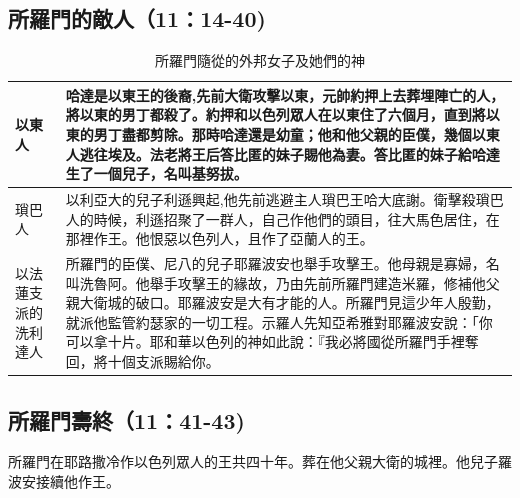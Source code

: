 \documentclass{ctexart}
\begin{document}
\subsection{所羅門的敵人（11：14-40)}
\begin{table}[!hbp]
\centering 
\begin{tabular}{|p{2cm}|p{14cm}|}
\hline
\hline
以東人&哈達是以東王的後裔,先前大衛攻擊以東，元帥約押上去葬埋陣亡的人，將以東的男丁都殺了。約押和以色列眾人在以東住了六個月，直到將以東的男丁盡都剪除。那時哈達還是幼童；他和他父親的臣僕，幾個以東人逃往埃及。法老將王后答比匿的妹子賜他為妻。答比匿的妹子給哈達生了一個兒子，名叫基努拔。\\\hline
瑣巴人&以利亞大的兒子利遜興起,他先前逃避主人瑣巴王哈大底謝。衛擊殺瑣巴人的時候，利遜招聚了一群人，自己作他們的頭目，往大馬色居住，在那裡作王。他恨惡以色列人，且作了亞蘭人的王。 \\\hline
以法蓮支派的洗利達人&所羅門的臣僕、尼八的兒子耶羅波安也舉手攻擊王。他母親是寡婦，名叫洗魯阿。他舉手攻擊王的緣故，乃由先前所羅門建造米羅，修補他父親大衛城的破口。耶羅波安是大有才能的人。所羅門見這少年人殷勤，就派他監管約瑟家的一切工程。示羅人先知亞希雅對耶羅波安說：「你可以拿十片。耶和華以色列的神如此說：『我必將國從所羅門手裡奪回，將十個支派賜給你。 \\\hline
\end{tabular}
\caption{所羅門隨從的外邦女子及她們的神}
\end{table}


\subsection{所羅門壽終（11：41-43)}
所羅門在耶路撒冷作以色列眾人的王共四十年。葬在他父親大衛的城裡。他兒子羅波安接續他作王。




  



\end{document}
